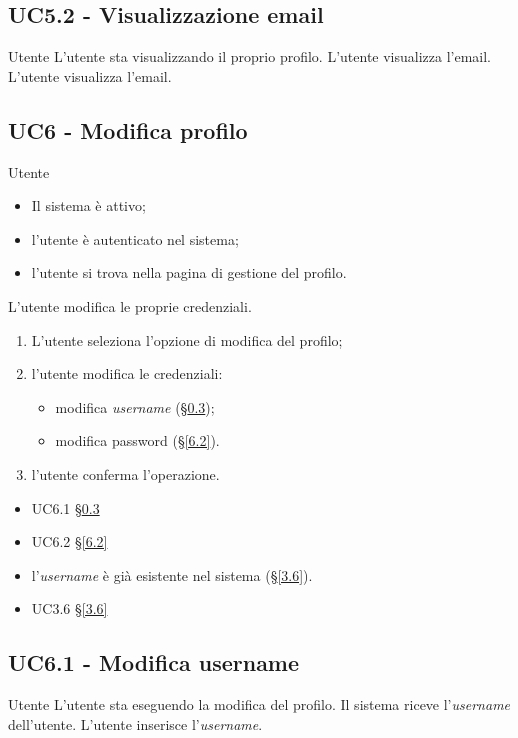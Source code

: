 \subsection{UC5.2 - Visualizzazione email}
\label{5.2}
\makeUC{}
{Utente}
{L'utente sta visualizzando il proprio profilo.}
{L'utente visualizza l'email.}
{L'utente visualizza l'email.}{}{}{}{}

\subsection{UC6 - Modifica profilo}
\label{6}
{Utente}
{   \begin{itemize}
        \item Il sistema è attivo;
        \item l'utente è autenticato nel sistema;
        \item l'utente si trova nella pagina di gestione del profilo.
    \end{itemize}
}
{L'utente modifica le proprie credenziali.}
{   \begin{enumerate}
        \item L'utente seleziona l'opzione di modifica del profilo;
        \item l'utente modifica le credenziali:
            \begin{itemize}
                \item modifica \textit{username} (§\ref{6.1});
                \item modifica password (§\ref{6.2}).
            \end{itemize}
        \item l'utente conferma l'operazione.
    \end{enumerate}
}
{   \begin{itemize}
        \item UC6.1 §\ref{6.1}
        \item UC6.2 §\ref{6.2}
    \end{itemize} 
}
{
    \begin{itemize}
        \item l'\textit{username} è già esistente nel sistema (§\ref{3.6}).
    \end{itemize}
}
{
    \begin{itemize}
        \item UC3.6 §\ref{3.6}
    \end{itemize}
}{}

\subsection{UC6.1 - Modifica username}
\label{6.1}
\makeUC{}
{Utente}
{L'utente sta eseguendo la modifica del profilo.}
{Il sistema riceve l'\textit{username} dell'utente.}
{L'utente inserisce l'\textit{username}.}{}{}{}{}

